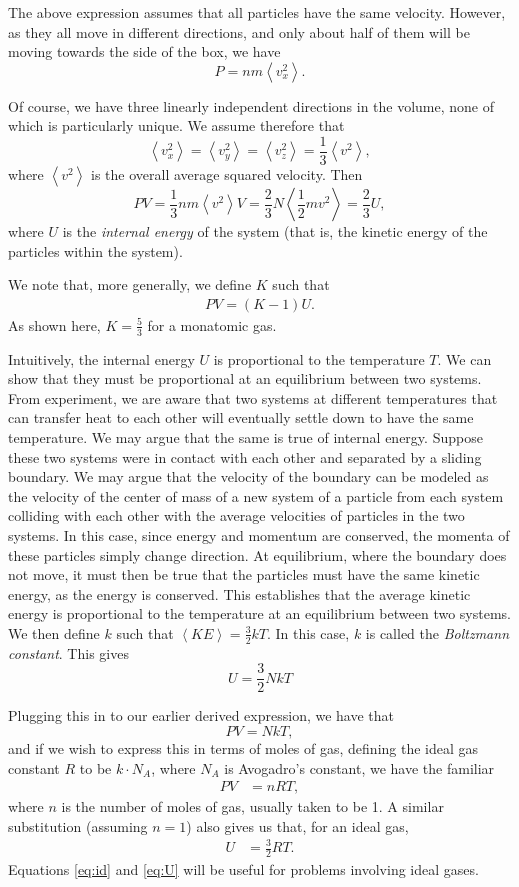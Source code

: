 The above expression assumes that all particles have the same velocity. However, as they all move in different directions, and only about half of them will be moving towards the side of the box, we have $$P = nm \left<v_x^2\right>.$$

Of course, we have three linearly independent directions in the volume, none of which is particularly unique. We assume therefore that $$\left<v_x^2\right> = \left<v_y^2\right> = \left<v_z^2\right> = \frac{1}{3} \left<v^2\right>,$$ where $\left<v^2\right>$ is the overall average squared velocity. Then $$PV = \frac{1}{3} nm \left<v^2 \right> V = \frac{2}{3} N \left<\frac{1}{2} mv^2\right> = \frac{2}{3} U,$$ where $U$ is the \textit{internal energy} of the system (that is, the kinetic energy of the particles within the system).

We note that, more generally, we define $K$ such that \begin{align}PV = (K-1) U.\label{eq:K}\end{align} As shown here, $K = \tfrac{5}{3}$ for a monatomic gas. 

Intuitively, the internal energy $U$ is proportional to the temperature $T$. We can show that they must be proportional at an equilibrium between two systems. From experiment, we are aware that two systems at different temperatures that can transfer heat to each other will eventually settle down to have the same temperature. We may argue that the same is true of internal energy. Suppose these two systems were in contact with each other and separated by a sliding boundary. We may argue that the velocity of the boundary can be modeled as the velocity of the center of mass of a new system of a particle from each system colliding with each other with the average velocities of particles in the two systems. In this case, since energy and momentum are conserved, the momenta of these particles simply change direction. At equilibrium, where the boundary does not move, it must then be true that the particles must have the same kinetic energy, as the energy is conserved. This establishes that the average kinetic energy is proportional to the temperature at an equilibrium between two systems. We then define $k$ such that $\left<KE\right> = \frac{3}{2}kT$. In this case, $k$ is called the \textit{Boltzmann constant}. This gives $$U = \frac{3}{2}NkT$$

Plugging this in to our earlier derived expression, we have that $$PV =NkT,$$ and if we wish to express this in terms of moles of gas, defining the ideal gas constant $R$ to be $k \cdot N_A$, where $N_A$ is Avogadro's constant, we have the familiar \begin{align}PV &= nRT,\label{eq:id}\end{align}
where $n$ is the number of moles of gas, usually taken to be 1. A similar substitution (assuming $n = 1$) also gives us that, for an ideal gas, \begin{align}U &= \frac{3}{2} RT.\label{eq:U}\end{align} Equations \ref{eq:id} and \ref{eq:U} will be useful for problems involving ideal gases. 


